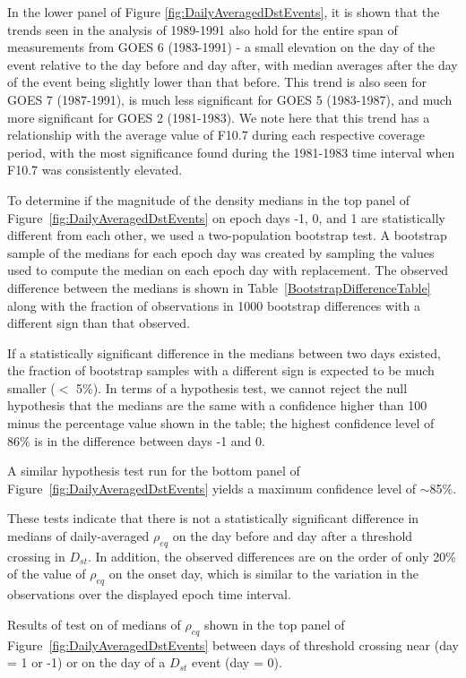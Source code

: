 \documentclass[12pt]{article}
\begin{document}
In the lower panel of Figure \ref{fig:DailyAveragedDstEvents}, it is shown that the trends seen in the analysis of 1989-1991 also hold for the entire span of measurements from GOES 6 (1983-1991) - a small elevation on the day of the event relative to the day before and day after, with median averages after the day of the event being slightly lower than that before.  This trend is also seen for GOES 7 (1987-1991), is much less significant for GOES 5 (1983-1987), and much more significant for GOES 2 (1981-1983).  We note here that this trend has a relationship with the average value of F10.7 during each respective coverage period, with the most significance found during the 1981-1983 time interval when F10.7 was consistently elevated.

To determine if the magnitude of the density medians in the top panel of Figure~\ref{fig:DailyAveragedDstEvents} on epoch days -1, 0, and 1 are statistically different from each other, we used a two-population bootstrap test.  A bootstrap sample of the medians for each epoch day was created by sampling the values used to compute the median on each epoch day with replacement.  The observed difference between the medians is shown in Table~\ref{BootstrapDifferenceTable} along with the fraction of observations in 1000 bootstrap differences with a different sign than that observed. 

If a statistically significant difference in the medians between two days existed, the fraction of bootstrap samples with a different sign is expected to be much smaller ($<$ 5\%).  In terms of a hypothesis test, we cannot reject the null hypothesis that the medians are the same with a confidence higher than 100 minus the percentage value shown in the table; the highest confidence level of 86\% is in the difference between days -1 and 0.

A similar hypothesis test run for the bottom panel of Figure~\ref{fig:DailyAveragedDstEvents} yields a maximum confidence level of $\sim$85\%.

These tests indicate that there is not a statistically significant difference in medians of daily-averaged $\rho_{eq}$ on the day before and day after a threshold crossing in $D_{st}$.  In addition, the observed differences are on the order of only 20\% of the value of $\rho_{eq}$ on the onset day, which is similar to the variation in the observations over the displayed epoch time interval.  

\begin{table}
\small
\centering

\caption{Results of test on of medians of $\rho_{eq}$ shown in the top panel of Figure~\ref{fig:DailyAveragedDstEvents} between days of threshold crossing  near (day = 1 or -1) or on the day of a $D_{st}$ event (day = 0).}
\label{BootstrapDifferenceTable}
\end{table}
\end{document}
